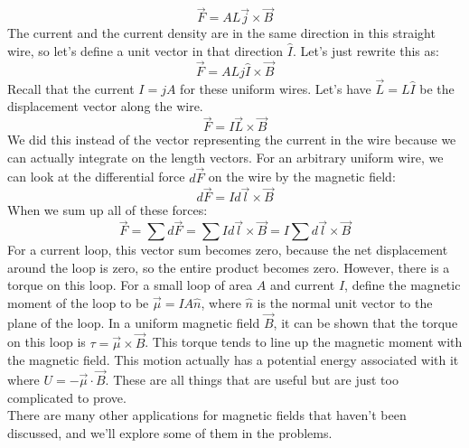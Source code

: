\[
	\vec F = AL \vec j \times \vec B
\]
The current and the current density are in the same direction in this straight wire, so let's define a unit vector in that direction $\hat I$. Let's just rewrite this as:
\[
	\vec F = ALj \hat I \times \vec B
\]
Recall that the current $I = jA$ for these uniform wires. Let's have $\vec L = L \hat I$ be the displacement vector along the wire. 
\[
	\vec F = I\vec L \times \vec B
\]
We did this instead of the vector representing the current in the wire because we can actually integrate on the length vectors. For an arbitrary uniform wire, we can look at the differential force $d\vec F$ on the wire by the magnetic field:
\[
	d\vec F = Id\vec l \times \vec B
\]
When we sum up all of these forces:
\[
	\vec F = \sum d\vec F = \sum I d\vec l \times \vec B = I \sum d\vec l \times \vec B
\]
For a current loop, this vector sum becomes zero, because the net displacement around the loop is zero, so the entire product becomes zero. However, there is a torque on this loop. For a small loop of area $A$ and current $I$, define the magnetic moment of the loop to be $\vec \mu = IA\hat n$, where $\hat n$ is the normal unit vector to the plane of the loop. In a uniform magnetic field $\vec B$, it can be shown that the torque on this loop is $\tau = \vec \mu \times \vec B$. This torque tends to line up the magnetic moment with the magnetic field. This motion actually has a potential energy associated with it where $U = -\vec \mu \cdot \vec B$. These are all things that are useful but are just too complicated to prove. \\
There are many other applications for magnetic fields that haven't been discussed, and we'll explore some of them in the problems. 
